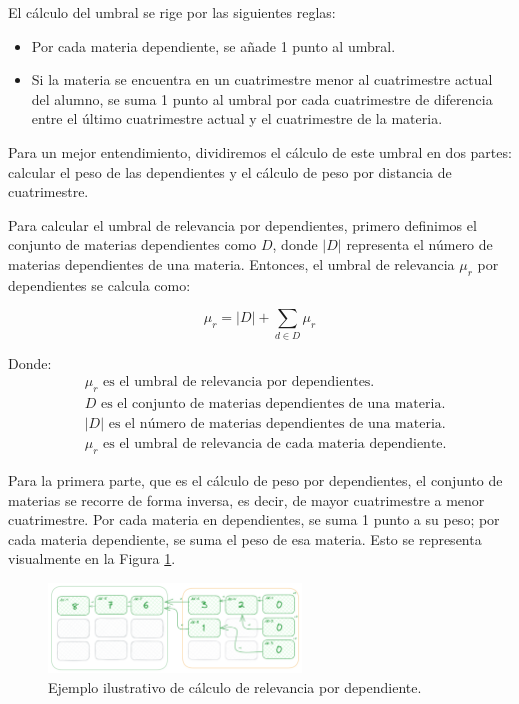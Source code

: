 El cálculo del umbral se rige por las siguientes reglas:

\begin{itemize}
    \item Por cada materia dependiente, se añade 1 punto al umbral.
    \item Si la materia se encuentra en un cuatrimestre menor al cuatrimestre actual del alumno, se suma 1 punto al umbral por cada cuatrimestre de diferencia entre el último cuatrimestre actual y el cuatrimestre de la materia.
\end{itemize}

Para un mejor entendimiento, dividiremos el cálculo de este umbral en dos partes: calcular el peso de las dependientes y el cálculo de peso por distancia de cuatrimestre.

Para calcular el umbral de relevancia por dependientes, primero definimos el conjunto de materias dependientes como \( D \), donde \( |D| \) representa el número de materias dependientes de una materia. Entonces, el umbral de relevancia \( \mu_r \) por dependientes se calcula como:

\begin{equation}
    \mu_r = |D| + \sum_{d \in D} \mu_r
    \label{eq:umbral_relevancia_por_dependientes}
\end{equation} 

Donde:
\begin{align*}
    & \mu_r \text{ es el umbral de relevancia por dependientes.} \\
    & D \text{ es el conjunto de materias dependientes de una materia.} \\
    & |D| \text{ es el número de materias dependientes de una materia.} \\
    & \mu_r \text{ es el umbral de relevancia de cada materia dependiente.}
\end{align*}

Para la primera parte, que es el cálculo de peso por dependientes, el conjunto de materias se recorre de forma inversa, es decir, de mayor cuatrimestre a menor cuatrimestre. Por cada materia en dependientes, se suma 1 punto a su peso; por cada materia dependiente, se suma el peso de esa materia. Esto se representa visualmente en la Figura \ref{fig:ejemplo_ilustrativo_calculo_de_relevancia_por_dependiente}.

\begin{figure}[h]
    \centering
    \includegraphics[width=0.6\textwidth]{images/relevance-by-dependents.png}
    \caption{Ejemplo ilustrativo de cálculo de relevancia por dependiente.}
    \label{fig:ejemplo_ilustrativo_calculo_de_relevancia_por_dependiente}
\end{figure}

